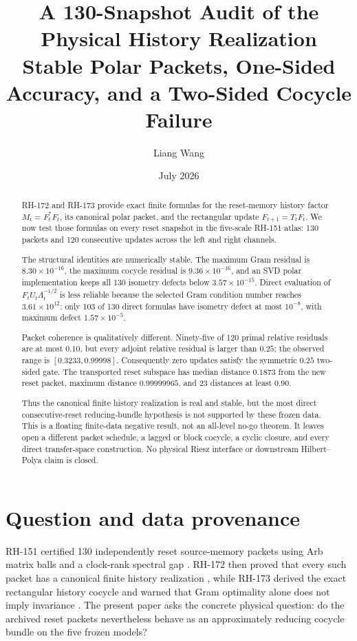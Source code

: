 \documentclass[12pt]{article}
\title{A 130-Snapshot Audit of the Physical History Realization\\
\large Stable Polar Packets, One-Sided Accuracy, and a Two-Sided Cocycle Failure}
\author{Liang Wang}
\date{July 2026}
\theoremstyle{remark}
\begin{document}
\maketitle

\begin{abstract}
RH-172 and RH-173 provide exact finite formulas for the reset-memory history
factor $M_t=F_t^*F_t$, its canonical polar packet, and the rectangular update
$F_{t+1}=T_tF_t$.  We now test those formulas on every reset snapshot in the
five-scale RH-151 atlas: 130 packets and 120 consecutive updates across the
left and right channels.

The structural identities are numerically stable.  The maximum Gram residual
is $8.30\times10^{-16}$, the maximum cocycle residual is
$9.36\times10^{-16}$, and an SVD polar implementation keeps all 130 isometry
defects below $3.57\times10^{-15}$.  Direct evaluation of
$F_tU_t\Lambda_t^{-1/2}$ is less reliable because the selected Gram condition
number reaches $3.61\times10^{12}$: only 103 of 130 direct formulas have
isometry defect at most $10^{-8}$, with maximum defect
$1.57\times10^{-5}$.

Packet coherence is qualitatively different.  Ninety-five of 120 primal
relative residuals are at most $0.10$, but every adjoint relative residual is
larger than $0.25$; the observed range is $[0.3233,0.99998]$.  Consequently
zero updates satisfy the symmetric $0.25$ two-sided gate.  The transported
reset subspace has median distance $0.1873$ from the new reset packet, maximum
distance $0.99999965$, and 23 distances at least $0.90$.

Thus the canonical finite history realization is real and stable, but the
most direct consecutive-reset reducing-bundle hypothesis is not supported by
these frozen data.  This is a floating finite-data negative result, not an
all-level no-go theorem.  It leaves open a different packet schedule, a
lagged or block cocycle, a cyclic closure, and every direct transfer-space
construction.  No physical Riesz interface or downstream Hilbert--Polya
claim is closed.
\end{abstract}

\section{Question and data provenance}

RH-151 certified 130 independently reset source-memory packets using Arb
matrix balls and a clock-rank spectral gap \citep{WangRH151}.  RH-172 then
proved that every such packet has a canonical finite history realization
\citep{WangRH172}, while RH-173 derived the exact rectangular history cocycle
and warned that Gram optimality alone does not imply invariance
\citep{WangRH173}.  The present paper asks the concrete physical question:
do the archived reset packets nevertheless behave as an approximately
reducing cocycle bundle on the five frozen models?
\end{document}
